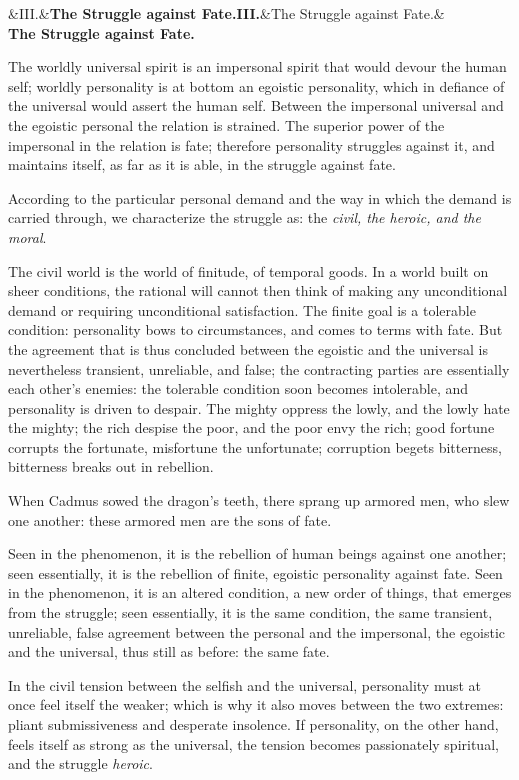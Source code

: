 \documentclass[12pt,a4paper,openany]{book}
\newcommand{\opage}[1]{\marginnote{\footnotesize\textit{[#1]}}}
\newcommand{\stykke}[2]{\begin{center}\ifx&#1&\textbf{#2}\else\textbf{#1}\ifx&#2&\else\\[0.2em]\textbf{#2}\fi\fi\end{center}}
\begin{document}
\stykke{III.}{The Struggle against Fate.}

The worldly universal spirit is an impersonal
spirit that would devour the human self;
worldly personality is at bottom an
egoistic personality, which in defiance of
the universal would assert the human self. Between
the impersonal universal and the egoistic
personal the relation is strained. The superior power
of the impersonal in the relation is fate; therefore
personality struggles against it, and maintains itself,
as far as it is able, in the struggle against fate.

\setcounter{footnote}{0}%
\opage{12}According to the particular personal demand
and the way in which the demand is carried through,
we characterize the struggle as: the \emph{civil, the heroic, and the moral}.

The civil world is the world of finitude,
of temporal goods. In a world built on
sheer conditions, the rational
will cannot then think of making
any unconditional demand or requiring unconditional
satisfaction. The finite goal is a tolerable
condition: personality bows to circumstances, and comes to terms with fate.
But the agreement that is thus concluded
between the egoistic and the universal is nevertheless
transient, unreliable, and false; the contracting
parties are essentially each other's enemies:
the tolerable condition soon becomes intolerable, and
personality is driven to despair. The
mighty oppress the lowly, and the lowly hate
the mighty; the rich despise the poor,
and the poor envy the rich; good fortune corrupts the fortunate, misfortune the unfortunate; corruption
begets bitterness, bitterness breaks
out in rebellion.

When Cadmus sowed the dragon's teeth, there
\setcounter{footnote}{0}%
\opage{13}sprang up armored men, who slew one another:
these armored men are the sons of fate.

Seen in the phenomenon, it is the rebellion of
human beings against one another; seen
essentially, it is the rebellion of finite, egoistic personality
against fate. Seen in the phenomenon,
it is an altered condition, a new
order of things, that emerges from the struggle;
seen essentially, it is the same condition, the
same transient, unreliable, false agreement
between the personal and the impersonal, the egoistic and the universal, thus
still as before: the same fate.

In the civil tension between the selfish
and the universal, personality must at once
feel itself the weaker; which is why it also
moves between the two extremes: pliant
submissiveness and desperate insolence. If
personality, on the other hand, feels itself as strong as
the universal, the tension becomes passionately
spiritual, and the struggle \emph{heroic}.
\end{document}
